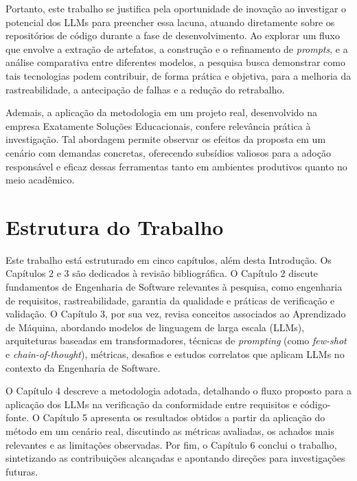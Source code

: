 Portanto, este trabalho se justifica pela oportunidade de inovação ao investigar o potencial dos LLMs para preencher essa lacuna, atuando diretamente sobre os repositórios de código durante a fase de desenvolvimento. Ao explorar um fluxo que envolve a extração de artefatos, a construção e o refinamento de \textit{prompts}, e a análise comparativa entre diferentes modelos, a pesquisa busca demonstrar como tais tecnologias podem contribuir, de forma prática e objetiva, para a melhoria da rastreabilidade, a antecipação de falhas e a redução do retrabalho.

Ademais, a aplicação da metodologia em um projeto real, desenvolvido na empresa Exatamente Soluções Educacionais, confere relevância prática à investigação. Tal abordagem permite observar os efeitos da proposta em um cenário com demandas concretas, oferecendo subsídios valiosos para a adoção responsável e eficaz dessas ferramentas tanto em ambientes produtivos quanto no meio acadêmico.

\section{Estrutura do Trabalho}
Este trabalho está estruturado em cinco capítulos, além desta Introdução. Os Capítulos 2 e 3 são dedicados à revisão bibliográfica. O Capítulo 2 discute fundamentos de Engenharia de Software relevantes à pesquisa, como engenharia de requisitos, rastreabilidade, garantia da qualidade e práticas de verificação e validação. O Capítulo 3, por sua vez, revisa conceitos associados ao Aprendizado de Máquina, abordando modelos de linguagem de larga escala (LLMs), arquiteturas baseadas em transformadores, técnicas de \textit{prompting} (como \textit{few-shot} e \textit{chain-of-thought}), métricas, desafios e estudos correlatos que aplicam LLMs no contexto da Engenharia de Software.

O Capítulo 4 descreve a metodologia adotada, detalhando o fluxo proposto para a aplicação dos LLMs na verificação da conformidade entre requisitos e código-fonte. O Capítulo 5 apresenta os resultados obtidos a partir da aplicação do método em um cenário real, discutindo as métricas avaliadas, os achados mais relevantes e as limitações observadas. Por fim, o Capítulo 6 conclui o trabalho, sintetizando as contribuições alcançadas e apontando direções para investigações futuras.